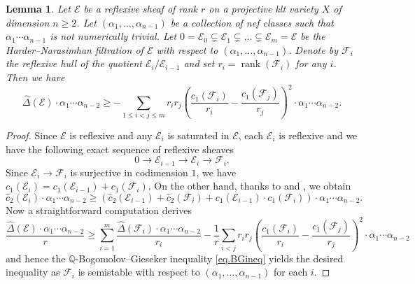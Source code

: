 \documentclass[12pt,twoside]{amsart}
\DeclareMathOperator{\rank}{rank}
\newtheorem{lem}[thm]{Lemma}
\theoremstyle{definition}
\begin{document}
\begin{lem}
	\label{lem.LangerIneqI}
	Let $\mathcal{E}$ be a reflexive sheaf of rank $r$ on a projective klt variety $X$ of dimension $n\geq 2$. Let $(\alpha_1,\dots,\alpha_{n-1})$ be a collection of nef classes such that $\alpha_1\cdots \alpha_{n-1}$ is not numerically trivial. Let $0=\mathcal{E}_0\subsetneq \mathcal{E}_1\subsetneq \dots\subsetneq \mathcal{E}_m=\mathcal{E}$ be the Harder--Narasimhan filtration of $\mathcal{E}$ with respect to $(\alpha_1,\dots,\alpha_{n-1})$. Denote by $\mathcal{F}_i$ the reflexive hull of the quotient $\mathcal{E}_i/\mathcal{E}_{i-1}$ and set $r_i=\rank(\mathcal{F}_i)$ for any $i$. Then we have
	\begin{equation}
		\label{eq.LangerIneqI}
	\hat{\Delta}(\mathcal{E})\cdot \alpha_1\cdots\alpha_{n-2} \geq - \sum_{1\leq i<j\leq m} r_i r_j \left(\frac{c_1(\mathcal{F}_i)}{r_i}-\frac{c_1(\mathcal{F}_j)}{r_j}\right)^2\cdot \alpha_1\cdots\alpha_{n-2}.
	\end{equation}
\end{lem}

\begin{proof}
	Since $\mathcal{E}$ is reflexive and any $\mathcal{E}_i$ is saturated in $\mathcal{E}$, each $\mathcal{E}_i$ is reflexive and we have the following exact sequence of reflexive sheaves
	\[
	0\longrightarrow \mathcal{E}_{i-1} \longrightarrow \mathcal{E}_i \longrightarrow \mathcal{F}_i.
	\]
	Since $\mathcal{E}_i\rightarrow \mathcal{F}_i$ is surjective in codimension $1$, we have $c_1(\mathcal{E}_i)=c_1(\mathcal{E}_{i-1}) + c_1(\mathcal{F}_i)$. On the other hand, thanks to \cite[Lemma~2.3]{Kawamata1992a} and \cite[Theorem~3.13]{GrebKebekusPeternellTaji2019a}, we obtain
	\[
	\hat{c}_2(\mathcal{E}_i)\cdot \alpha_1 \cdots \alpha_{n-2} \geq \left(\hat{c}_2(\mathcal{E}_{i-1}) + \hat{c}_2(\mathcal{F}_i) + c_1(\mathcal{E}_{i-1})\cdot c_1(\mathcal{F}_i)\right)\cdot \alpha_1\cdots\alpha_{n-2}.
	\]
	Now a straightforward computation derives
	\[
	\frac{\hat{\Delta}(\mathcal{E})\cdot \alpha_1\cdots \alpha_{n-2}}{r} \geq \sum_{i=1}^{m} \frac{\hat{\Delta}(\mathcal{F}_i)\cdot \alpha_1\cdots \alpha_{n-2}}{r_i} - \frac{1}{r}\sum_{i<j} r_i r_j \left(\frac{c_1(\mathcal{F}_i)}{r_i}-\frac{c_1(\mathcal{F}_j)}{r_j}\right)^2\cdot \alpha_1\cdots\alpha_{n-2}
	\]
	and hence the $\mathbb{Q}$-Bogomolov--Gieseker inequality \eqref{eq.BGineq} yields the desired inequality as $\mathcal{F}_i$ is semistable with respect to $(\alpha_1,\dots,\alpha_{n-1})$ for each $i$.
\end{proof}
\end{document}
